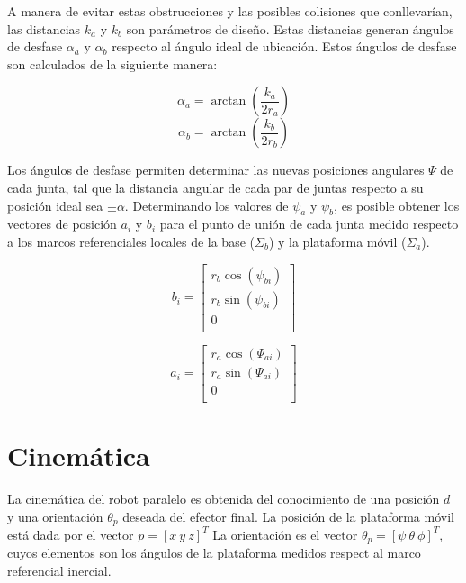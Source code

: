 A manera de evitar estas obstrucciones y las posibles 
colisiones que conllevarían, 
las distancias $k_a$ y $k_b$ son parámetros de diseño.
Estas distancias generan ángulos de desfase 
$\alpha_a$ y $\alpha_b$ respecto al ángulo ideal de ubicación.
Estos ángulos de desfase son calculados de la siguiente manera:

\begin{equation} \label{eq: azi-a}
\alpha_a = \arctan\left(\frac{k_a}{2r_a}\right)
\end{equation}
\begin{equation} \label{eq: azi-b}
\alpha_b = \arctan\left(\frac{k_b}{2r_b}\right)
\end{equation}

Los ángulos de desfase permiten determinar las nuevas posiciones angulares 
$\Psi$ de cada junta, tal que la distancia angular de cada par de juntas 
respecto a su posición ideal sea $\pm \alpha$. 
Determinando los valores de $\psi_a$ y $\psi_b$, es posible
obtener los vectores de posición $  a_i$ y $  b_i$ 
para el punto de unión de cada junta
medido respecto a los marcos referenciales locales de 
la base ($\Sigma_b$) y la plataforma móvil ($\Sigma_a$).


\begin{equation} \label{eq: p_b}
  b_i = \begin{bmatrix}
r_b\cos(\psi_{bi})\\
r_b\sin(\psi_{bi})\\
0\\
\end{bmatrix}
\end{equation}

\begin{equation} \label{eq: p_a}
  a_i = \begin{bmatrix}
r_a\cos(\Psi_{ai})\\
r_a\sin(\Psi_{ai})\\
0\\
\end{bmatrix}
\end{equation}

\section{Cinemática}

La cinemática del robot paralelo es obtenida del conocimiento de una posición $  d$
y una orientación $  \theta_p$ deseada del efector final.
La posición de la plataforma móvil está dada por el vector $  p = [x \ y \ z]^T$
La orientación es el vector $  \theta_p = [\psi \ \theta \ \phi]^T$, 
cuyos elementos son los ángulos de la plataforma medidos respect al marco referencial inercial.

